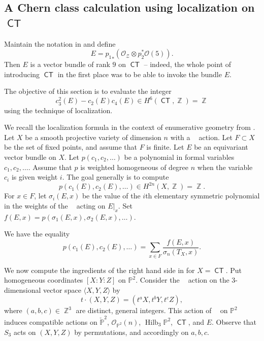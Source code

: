 \documentclass{article}
\renewcommand{\P}{\mathbb{P}}
\DeclareMathOperator{\Hilb}{Hilb}
\renewcommand{\O}{\mathcal{O}}
\DeclareMathOperator{\CT}{\mathsf{CT}}
\DeclareMathOperator{\Gm}{\mathbb{G}_{m}}
\DeclareMathOperator{\Z}{\mathbb{Z}}
\begin{document}
\subsection{A Chern class calculation using localization on $\CT$}
\label{sec:Chern}
Maintain the notation in  and define 
\[ E = {p_1}_* \left(\O_{\mathcal{Z}} \otimes p_2^* \O(5)\right).\] Then $E$ is a vector bundle of rank
$9$ on $\CT$ -- indeed, the whole point of introducing $\CT$ in the first
place was to be able to invoke the bundle $E$.




The objective of this section is to evaluate the integer
\[  c_{3}^2(E) - c_{2} (E) c_{4}(E) \in H^6(\CT, \Z) = \Z\] using the
technique of localization.

We recall the localization formula in the context of enumerative
geometry from \cite{ell.str}.  Let $X$ be a smooth projective variety
of dimension $n$ with a $\Gm$ action.  Let $F \subset X$ be the set of
fixed points, and assume that $F$ is finite.  Let $E$ be an
equivariant vector bundle on $X$.  Let $p(c_1, c_2, \dots)$ be a
polynomial in formal variables $c_1, c_2, \dots$.  Assume that $p$ is
weighted homogeneous of degree $n$ when the variable $c_i$ is given
weight $i$.  The goal generally is to compute
\[ p(c_1(E), c_2(E), \dots ) \in H^{2n}(X, \Z) = \Z.\] For $x \in F$,
let $\sigma_i(E, x)$ be the value of the $i$th
elementary symmetric polynomial in the weights of the $\Gm$ acting on
$E|_x$.  Set $f(E, x) = p(\sigma_1(E, x), \sigma_2(E,x), \dots)$.
\begin{theorem}
  \label{thm:localization}
  We have the equality
  \[ p(c_1(E), c_2(E), \dots ) = \sum_{x \in F} \frac{f(E, x)}{\sigma_n(T_X, x)}. \]
\end{theorem}

We now compute the ingredients of the right hand side in
 for $X = \CT$.  Put homogeneous coordinates
$[X:Y:Z]$ on $\P^2$.  Consider the $\Gm$ action on the $3$-dimensional vector space $\langle X, Y, Z \rangle$ by
\[ t \cdot (X, Y, Z) = (t^a X, t^b Y, t^c Z),\] where
$(a,b,c) \in \Z^3$ are distinct, general integers.  This action of $\Gm$ on
$\P^2$ induces compatible actions on $\check{\P}^{2}$, $\O_{\P^2}(n)$, $\Hilb_3 \P^2$, $\CT$, and
$E$.  Observe that $S_3$ acts on $(X,Y,Z)$ by permutations, and accordingly on $a,b,c$.
\end{document}
